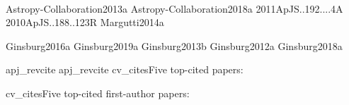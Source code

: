\documentclass[12pt]{article}
\begin{document}

  









%

%
%
%
%
%
%
%
%
%
%
%
%
%
%
%
%
%
%
%
%






\nocite{biba}{Astropy-Collaboration2013a}
\nocite{biba}{Astropy-Collaboration2018a}
\nocite{biba}{2011ApJS..192....4A}
\nocite{biba}{2010ApJS..188..123R}
\nocite{biba}{Margutti2014a}

\nocite{bibb}{Ginsburg2016a}
\nocite{bibb}{Ginsburg2019a}
\nocite{bibb}{Ginsburg2013b}
\nocite{bibb}{Ginsburg2012a}
\nocite{bibb}{Ginsburg2018a}

{apj_revcite}
{apj_revcite}
%
%
{cv_cites}{Five top-cited papers:}
%


{cv_cites}{Five top-cited first-author  papers:}
\end{document}
